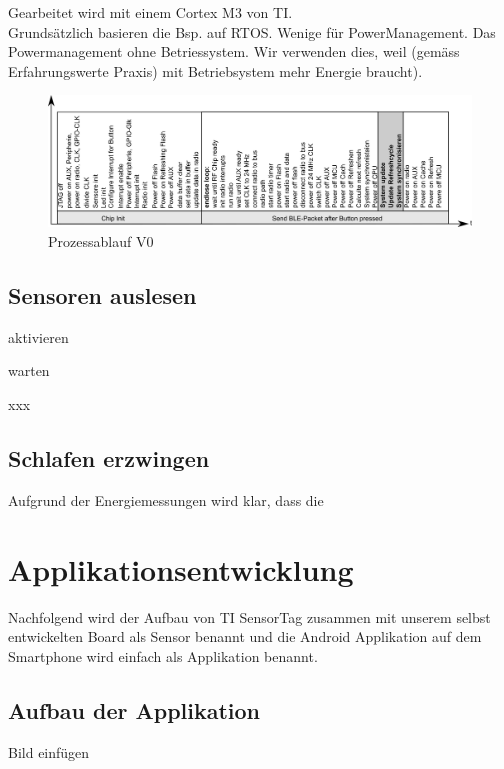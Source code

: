 Gearbeitet wird mit einem Cortex M3 von TI.\\ 
Grundsätzlich basieren die Bsp. auf RTOS. Wenige für PowerManagement. Das Powermanagement ohne Betriessystem. Wir verwenden dies, weil (gemäss Erfahrungswerte Praxis) mit Betriebsystem mehr Energie braucht).


\begin{figure}
  \includegraphics[width=1.0\textwidth]{../ressources/SimpleLink/V0Sendeablauf.png}
  \caption{Prozessablauf V0}
\end{figure}



\subsection{Sensoren auslesen}

aktivieren

warten

xxx




\subsection{Schlafen erzwingen}

Aufgrund der Energiemessungen wird klar, dass die 


\section{Applikationsentwicklung}
Nachfolgend wird der Aufbau von TI SensorTag zusammen mit unserem selbst entwickelten Board als Sensor benannt und die Android Applikation auf dem Smartphone wird einfach als Applikation benannt.

\subsection{Aufbau der Applikation}

Bild einfügen

